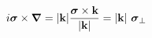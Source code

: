 \begin{equation}
i \mbox{\boldmath $\sigma$} \times \mbox{\boldmath $\nabla$} = |{\bf k}| 
\frac{\mbox{\boldmath $\sigma$} \times {\bf k}}{|{\bf k}|}=
|{\bf k}| ~\mbox{\boldmath $\sigma$}_{\perp} 
\end{equation}

